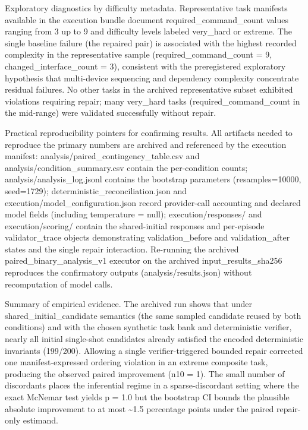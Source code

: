 \documentclass[conference]{IEEEtran}
\begin{document}
Exploratory diagnostics by difficulty metadata. Representative task manifests available in the execution bundle document required\_command\_count values ranging from 3 up to 9 and difficulty levels labeled very\_hard or extreme. The single baseline failure (the repaired pair) is associated with the highest recorded complexity in the representative sample (required\_command\_count = 9, changed\_interface\_count = 3), consistent with the preregistered exploratory hypothesis that multi-device sequencing and dependency complexity concentrate residual failures. No other tasks in the archived representative subset exhibited violations requiring repair; many very\_hard tasks (required\_command\_count in the mid-range) were validated successfully without repair.

Practical reproducibility pointers for confirming results. All artifacts needed to reproduce the primary numbers are archived and referenced by the execution manifest: analysis/paired\_contingency\_table.csv and analysis/condition\_summary.csv contain the per-condition counts; analysis/analysis\_log.jsonl contains the bootstrap parameters (resamples=10000, seed=1729); deterministic\_reconciliation.json and execution/model\_configuration.json record provider-call accounting and declared model fields (including temperature = null); execution/responses/ and execution/scoring/ contain the shared-initial responses and per-episode validator\_trace objects demonstrating validation\_before and validation\_after states and the single repair interaction. Re-running the archived paired\_binary\_analysis\_v1 executor on the archived input\_results\_sha256 reproduces the confirmatory outputs (analysis/results.json) without recomputation of model calls.

Summary of empirical evidence. The archived run shows that under shared\_initial\_candidate semantics (the same sampled candidate reused by both conditions) and with the chosen synthetic task bank and deterministic verifier, nearly all initial single-shot candidates already satisfied the encoded deterministic invariants (199/200). Allowing a single verifier-triggered bounded repair corrected one manifest-expressed ordering violation in an extreme composite task, producing the observed paired improvement (n10 = 1). The small number of discordants places the inferential regime in a sparse-discordant setting where the exact McNemar test yields p = 1.0 but the bootstrap CI bounds the plausible absolute improvement to at most \textasciitilde{}1.5 percentage points under the paired repair-only estimand.
\end{document}
